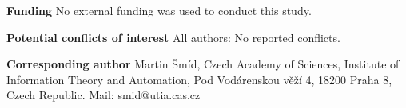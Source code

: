 \documentclass[a4paper,12pt]{article}
\begin{document}


{\bf Funding} {\rm No external funding was used to conduct this study.} 

{\bf Potential conflicts of interest} All authors: No reported conflicts. 


{\bf Corresponding author} {\rm Martin Šmíd, Czech Academy of Sciences, Institute of Information Theory and Automation, Pod Vodárenskou věží 4, 18200 Praha 8, Czech Republic. Mail: smid@utia.cas.cz }




\end{document}
